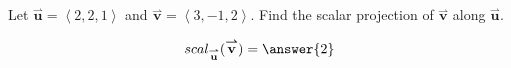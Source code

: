 \documentclass{ximera}
\author{Gregory Hartman \and Matthew Carr \and Bart Snapp}
\begin{document}
\begin{exercise}
Let $\overset{\boldsymbol{\rightharpoonup}}{\mathbf{u}} = \left< 2,2,1 \right>$ and $\overset{\boldsymbol{\rightharpoonup}}{\mathbf{v}} = \left< 3,-1,2 \right>$. Find the
scalar projection of $\overset{\boldsymbol{\rightharpoonup}}{\mathbf{v}}$ along $\overset{\boldsymbol{\rightharpoonup}}{\mathbf{u}}$.
\begin{prompt}
\[
scal_{\overset{\boldsymbol{\rightharpoonup}}{\mathbf{u}}}(\overset{\boldsymbol{\rightharpoonup}}{\mathbf{v}})=\answer{2}
\]
\end{prompt}

\end{exercise}
\end{document}
